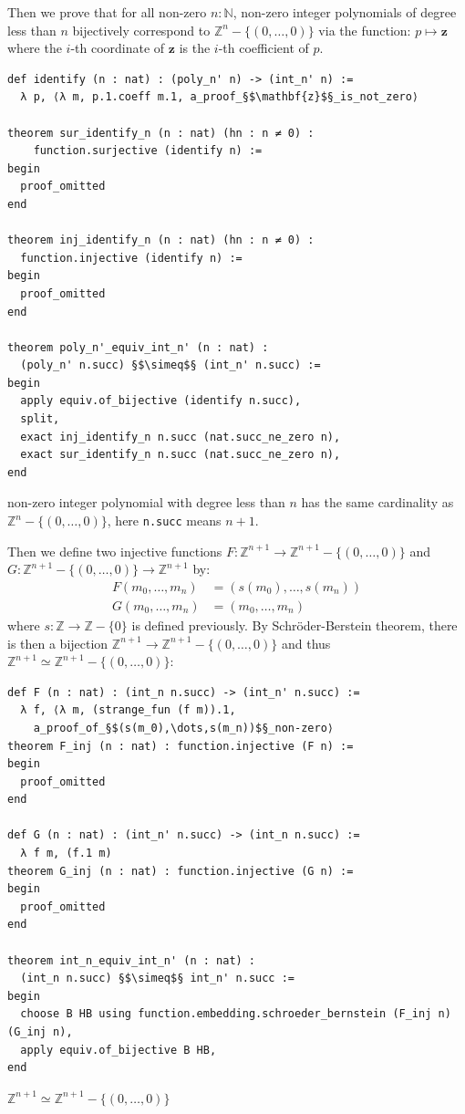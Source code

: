 \documentclass{report}
\theoremstyle{definition}
\newenvironment{code}{\captionsetup{type=listing}}{}
\begin{document}
Then we prove that for all non-zero $n:\mathbb N$, non-zero integer polynomials of degree less than $n$ bijectively correspond to $\mathbb Z^n-\{(0,\dots,0)\}$ via the function:
$p\mapsto \mathbf{z}$ where the $i$-th coordinate of $\mathbf{z}$ is the $i$-th coefficient of $p$.
\begin{code}
\begin{verbatim}
def identify (n : nat) : (poly_n' n) -> (int_n' n) := 
  λ p, ⟨λ m, p.1.coeff m.1, a_proof_§$\mathbf{z}$§_is_not_zero⟩

theorem sur_identify_n (n : nat) (hn : n ≠ 0) : 
    function.surjective (identify n) :=
begin
  proof_omitted
end

theorem inj_identify_n (n : nat) (hn : n ≠ 0) : 
  function.injective (identify n) :=
begin
  proof_omitted
end

theorem poly_n'_equiv_int_n' (n : nat) : 
  (poly_n' n.succ) §$\simeq$§ (int_n' n.succ) :=
begin
  apply equiv.of_bijective (identify n.succ),
  split,
  exact inj_identify_n n.succ (nat.succ_ne_zero n),
  exact sur_identify_n n.succ (nat.succ_ne_zero n),
end
\end{verbatim}
\caption{non-zero integer polynomial with degree less than $n$ has the same cardinality as $\mathbb Z^n-\{(0,\dots,0)\}$, here {\tt \small n.succ} means $n+1$.}
\end{code}

Then we define two injective functions $F : \mathbb{Z}^{n+1}\to\mathbb{Z}^{n+1}-\{(0,\dots,0)\}$ and $G : \mathbb{Z}^{n+1}-\{(0,\dots,0)\}\to\mathbb{Z}^{n+1}$ by:
\begin{equation*}
\begin{aligned}
F (m_0,\dots,m_n) &= (s(m_0),\dots,s(m_n)) \\
G (m_0,\dots,m_n) &= (m_0,\dots,m_n)
\end{aligned}
\end{equation*}
where $s:\mathbb Z\to \mathbb Z-\{0\}$ is defined previously. By Schröder-Berstein theorem, there is then a bijection $\mathbb{Z}^{n+1}\to\mathbb{Z}^{n+1}-\{(0,\dots,0)\}$ and thus $\mathbb{Z}^{n+1}\simeq\mathbb{Z}^{n+1}-\{(0,\dots,0)\}$:
\begin{code}
\begin{verbatim}
def F (n : nat) : (int_n n.succ) -> (int_n' n.succ) := 
  λ f, ⟨λ m, (strange_fun (f m)).1,
    a_proof_of_§$(s(m_0),\dots,s(m_n))$§_non-zero⟩
theorem F_inj (n : nat) : function.injective (F n) :=
begin
  proof_omitted
end

def G (n : nat) : (int_n' n.succ) -> (int_n n.succ) := 
  λ f m, (f.1 m)
theorem G_inj (n : nat) : function.injective (G n) :=
begin
  proof_omitted
end

theorem int_n_equiv_int_n' (n : nat) : 
  (int_n n.succ) §$\simeq$§ int_n' n.succ :=
begin
  choose B HB using function.embedding.schroeder_bernstein (F_inj n) (G_inj n),
  apply equiv.of_bijective B HB,
end
\end{verbatim}
\caption{$\mathbb{Z}^{n+1}\simeq\mathbb{Z}^{n+1}-\{(0,\dots,0)\}$}
\end{code}
\end{document}
